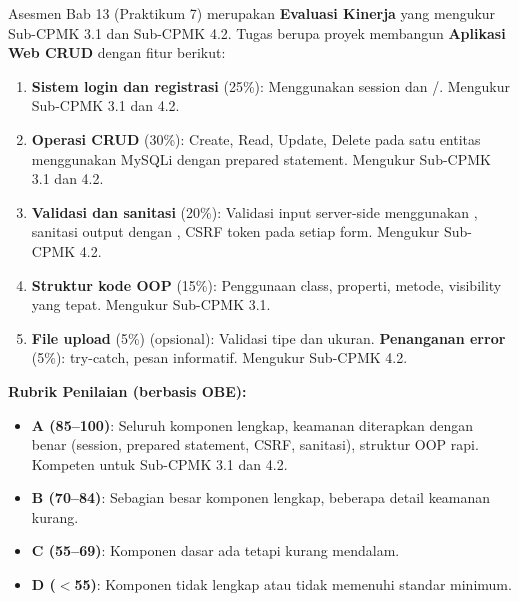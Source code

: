 \documentclass[../main.tex]{subfiles}
\begin{document}
\begin{asesmen}
Asesmen Bab 13 (Praktikum 7) merupakan \textbf{Evaluasi Kinerja} yang mengukur Sub-CPMK 3.1 dan Sub-CPMK 4.2. Tugas berupa proyek membangun \textbf{Aplikasi Web CRUD} dengan fitur berikut:
\begin{enumerate}
  \item \textbf{Sistem login dan registrasi} (25\%): Menggunakan session dan /. Mengukur Sub-CPMK 3.1 dan 4.2.
  \item \textbf{Operasi CRUD} (30\%): Create, Read, Update, Delete pada satu entitas menggunakan MySQLi dengan prepared statement. Mengukur Sub-CPMK 3.1 dan 4.2.
  \item \textbf{Validasi dan sanitasi} (20\%): Validasi input server-side menggunakan , sanitasi output dengan , CSRF token pada setiap form. Mengukur Sub-CPMK 4.2.
  \item \textbf{Struktur kode OOP} (15\%): Penggunaan class, properti, metode, visibility yang tepat. Mengukur Sub-CPMK 3.1.
  \item \textbf{File upload} (5\%) (opsional): Validasi tipe dan ukuran. \textbf{Penanganan error} (5\%): try-catch, pesan informatif. Mengukur Sub-CPMK 4.2.
\end{enumerate}

\textbf{Rubrik Penilaian (berbasis OBE):}
\begin{itemize}
  \item \textbf{A (85--100)}: Seluruh komponen lengkap, keamanan diterapkan dengan benar (session, prepared statement, CSRF, sanitasi), struktur OOP rapi. Kompeten untuk Sub-CPMK 3.1 dan 4.2.
  \item \textbf{B (70--84)}: Sebagian besar komponen lengkap, beberapa detail keamanan kurang.
  \item \textbf{C (55--69)}: Komponen dasar ada tetapi kurang mendalam.
  \item \textbf{D ($<$55)}: Komponen tidak lengkap atau tidak memenuhi standar minimum.
\end{itemize}
\end{asesmen}
\end{document}
